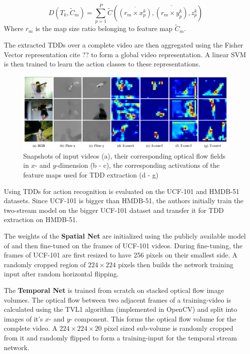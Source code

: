 \begin{equation*}
    D(T_k, \tilde{C}_m) = \sum_{p=1}^P \tilde{C}(\overline{(r_m \times x_p^k)}, \overline{(r_m \times y_p^k)}, z_p^k)
\end{equation*}
Where $r_m$ is the map size ratio belonging to feature map $\tilde{C}_m$.

The extracted TDDs over a complete video are then aggregated using the Fisher Vector representation cite ?? to form a global video representation.
A linear SVM is then trained to learn the action classes to these representations.

\begin{figure}[H]
    \centering
    \includegraphics[width=\textwidth]{img_deep/tdd_featuremaps}
    \caption{Snapshots of input videos (a), their corresponding optical flow fields in $x$- and $y$-dimension (b - c), the corresponding activations of the feature maps used for TDD extraction (d - g) \cite{wang_action_2015}}
    \label{fig:tdd_featuremaps}
\end{figure}

Using TDDs for action recognition is evaluated on the UCF-101 and HMDB-51 datasets. Since UCF-101 is bigger than HMDB-51, the authors initially train the two-stream model on the bigger UCF-101 dataset and transfer it for TDD extraction on HMDB-51.

The weights of the \textbf{Spatial Net} are initialized using the publicly available model of \cite{chatfield_return_2014} and then fine-tuned on the frames of UCF-101 videos.
During fine-tuning, the frames of UCF-101 are first resized to have 256 pixels on their smallest side.
A randomly cropped region of $224 \times 224$ pixels then builds the network training input after random horizontal flipping.

The \textbf{Temporal Net} is trained from scratch on stacked optical flow image volumes.
The optical flow between two adjacent frames of a training-video is calculated using the TVL1 algorithm \cite{zach_duality_2007} (implemented in OpenCV) and split into images of it's $x$- and $y$- component.
This forms the optical flow volume for the complete video.
A $224 \times 224 \times 20$ pixel sized sub-volume is randomly cropped from it and randomly flipped to form a training-input for the temporal stream network.

